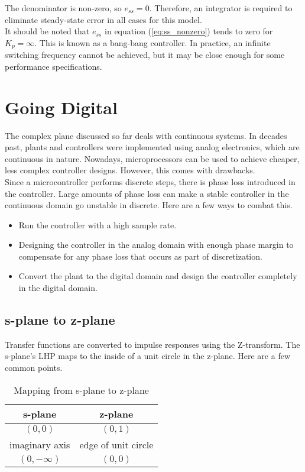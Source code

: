 \documentclass[10pt,conference,compsoc]{IEEEtran}
\begin{document}
\noindent The denominator is non-zero, so $e_{ss} = 0$. Therefore, an integrator
is required to eliminate \gls{steady-state error} in all cases for this model.
\\

\noindent It should be noted that $e_{ss}$ in equation (\ref{eq:ss_nonzero})
tends to zero for $K_p = \infty$. This is known as a bang-bang controller. In
practice, an infinite switching frequency cannot be achieved, but it may be
close enough for some performance specifications.

\section{Going Digital}

\noindent The complex plane discussed so far deals with continuous
\glspl{system}. In decades past, \glspl{plant} and controllers were implemented
using analog electronics, which are continuous in nature. Nowadays,
microprocessors can be used to achieve cheaper, less complex controller designs.
However, this comes with drawbacks. \\

\noindent Since a microcontroller performs discrete steps, there is phase loss
introduced in the controller. Large amounts of phase loss can make a stable
controller in the continuous domain go unstable in discrete. Here are a few ways
to combat this.

\begin{itemize}
  \item Run the controller with a high sample rate.
  \item Designing the controller in the analog domain with enough phase margin
    to compensate for any phase loss that occurs as part of discretization.
  \item Convert the \gls{plant} to the digital domain and design the controller
    completely in the digital domain.
\end{itemize}

\subsection{s-plane to z-plane}

\noindent Transfer functions are converted to impulse responses using the
Z-transform. The s-plane's LHP maps to the inside of a unit circle in the
z-plane. Here are a few common points.

\begin{table}[ht]
  \caption{Mapping from s-plane to z-plane}
  \renewcommand{\arraystretch}{1.3}
  \centering
  \begin{tabular}{|cc|}
    \hline
    \textbf{s-plane} & \textbf{z-plane} \\
    \hline
    $(0, 0)$ & $(0, 1)$ \\
    imaginary axis & edge of unit circle \\
    $(0, -\infty)$ & $(0, 0)$ \\
    \hline
  \end{tabular}
  \label{tab:s-plane2z-plane}
\end{table}
\end{document}
